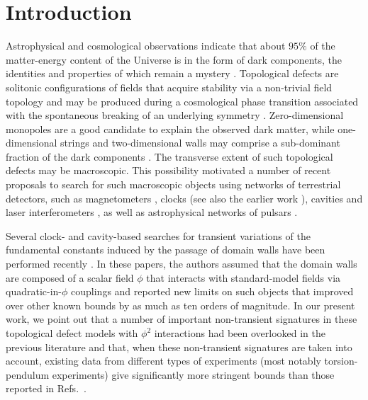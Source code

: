 \documentclass[aps,prd,onecolumn,nofootinbib]{revtex4-2} %
\begin{document}
\section{Introduction}
\label{Sec:Intro}
Astrophysical and cosmological observations indicate that about $95\%$ of the matter-energy content of the Universe is in the form of dark components, the identities and properties of which remain a mystery \cite{PDG_2018_review}. 
Topological defects are solitonic configurations of fields that acquire stability via a non-trivial field topology and may be produced during a cosmological phase transition associated with the spontaneous breaking of an underlying symmetry \cite{Vilenkin_1985_TDs}. 
Zero-dimensional monopoles are a good candidate to explain the observed dark matter, while one-dimensional strings and two-dimensional walls may comprise a sub-dominant fraction of the dark components \cite{Spergel_1989_walls,Hindmarsh_2008_strings}. 
The transverse extent of such topological defects may be macroscopic. 
This possibility motivated a number of recent proposals to search for such macroscopic objects using networks of terrestrial detectors, such as magnetometers \cite{Pospelov_2013_TDM-magnetometers}, clocks \cite{Derevianko_2014_TDM-clocks} (see also the earlier work \cite{Olive-Wall_2011_TD-clock}), cavities and laser interferometers \cite{Stadnik_2015_DM-LIFO,Stadnik_2016_DM-cavities,Stadnik_2019_DM-LIFO}, as well as astrophysical networks of pulsars \cite{Stadnik_2014_TDM-pulsars}. 

Several clock- and cavity-based searches for transient variations of the fundamental constants induced by the passage of domain walls have been performed recently \cite{Wcislo_2016_TDM-cavity,Roberts_2017_TDM-GPS,Wcislo_2018_TDM-cavity,Roberts_2019_TDM-clocks}. 
In these papers, the authors assumed that the domain walls are composed of a scalar field $\phi$ that interacts with standard-model fields via quadratic-in-$\phi$ couplings and reported new limits on such objects that improved over other known bounds by as much as ten orders of magnitude. 
In our present work, we point out that a number of important non-transient signatures in these topological defect models with $\phi^2$ interactions had been overlooked in the previous literature and that, when these non-transient signatures are taken into account, existing data from different types of experiments (most notably torsion-pendulum experiments) give significantly more stringent bounds than those reported in Refs.~\cite{Wcislo_2016_TDM-cavity,Roberts_2017_TDM-GPS,Wcislo_2018_TDM-cavity,Roberts_2019_TDM-clocks}. 
\end{document}
